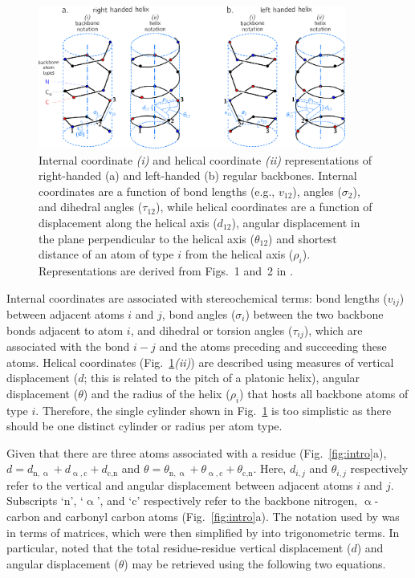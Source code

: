 \documentclass[fleqn,10pt,lineno]{wlpeerj} %
\newcommand{\n}[1]{{\color{blue}#1}}
\newcommand{\Fig}[1]{Fig.~\ref{#1}}
\begin{document}
\begin{figure}[t!]
\mbox{}\hfill
\includegraphics[width=0.9\textwidth]{./figures/helix_peptide.pdf}
\hfill\mbox{}\hfill\mbox{}\newline
\caption{\label{fig:helix}
Internal coordinate \textit{(i)} and helical coordinate \textit{(ii)} representations of right-handed (a) and left-handed (b) regular backbones. Internal coordinates are a function of bond lengths (e.g., $v_{12}$), angles ($\sigma_{2}$), and dihedral angles ($\tau_{12}$), while helical coordinates are a function of displacement along the helical axis ($d_{12}$), angular displacement in the plane perpendicular to the helical axis ($\theta_{12}$) and shortest distance of an atom \n{of type $i$} from the helical axis ($\rho_i$). Representations are derived from Figs.~1 and~2 in  \cite{Shimanouchi1955}.
}
\end{figure}

Internal coordinates are associated with stereochemical terms: bond lengths ($v_{ij}$) between adjacent atoms $i$ and $j$, bond angles ($\sigma_{i}$) between the two backbone bonds adjacent to atom $i$, and dihedral or torsion angles ($\tau_{ij}$), which are associated with the bond $i-j$ and the atoms preceding and succeeding these atoms. Helical coordinates (\Fig{fig:helix}\textit{(ii)}) are described using measures of vertical displacement ($d$; this is related to the pitch of a platonic helix), angular displacement ($\theta$) \n{and the radius of the helix ($\rho_i$) that hosts all backbone atoms of type $i$. Therefore, the single cylinder shown in \Fig{fig:helix} is too simplistic as there should be one distinct cylinder or radius per atom type.}

Given that there are three atoms associated with a residue (\Fig{fig:intro}a), \n{$d = d_{\textrm{n},\upalpha}+d_{\upalpha,\textrm{c}}+d_{\textrm{c},\textrm{n}}$ and $\theta = \theta_{\textrm{n},\upalpha}+\theta_{\upalpha,\textrm{c}}+\theta_{\textrm{c},\textrm{n}}$. Here, $d_{i,j}$ and $\theta_{i,j}$ respectively refer to the vertical and angular displacement between adjacent atoms $i$ and $j$. Subscripts `$\textrm{n}$', `$\upalpha$', and `$\textrm{c}$' respectively refer to the backbone nitrogen, $\upalpha$-carbon and carbonyl carbon atoms (\Fig{fig:intro}a).} The notation used by \cite{Shimanouchi1955} was in terms of matrices, which were then simplified by \cite{Miyazawa1961} into trigonometric terms. In particular, \cite{Miyazawa1961} noted that the total residue-residue vertical displacement ($d$) and angular displacement ($\theta$) may be retrieved using the following two equations.
\end{document}
